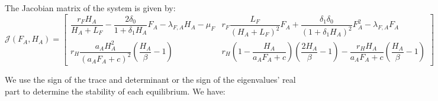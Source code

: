 \documentclass{article}
\newcommand{\lfa}{\lambda_{F, A}}
\begin{document}
The Jacobian matrix of the system is given by:
\begin{equation}
\mathcal{J}(F_A,H_A) =  \begin{bmatrix}
\dfrac{r_F H_A}{H_A+L_F}- \dfrac{2\delta_0}{1 + \delta_1 H_A}F_A - \lfa H_A - \mu_F & r_F \dfrac{L_F}{(H_A+L_F)^2}F_A + \dfrac{\delta_1 \delta_0}{(1+\delta_1 H_A)^2} F_A^2  - \lfa F_A\\
r_H \dfrac{a_AH_A^2}{(a_AF_A+c)^2} (\dfrac{H_A}{\beta}-1) & r_H(1-\dfrac{H_A}{a_AF_A+c})(\dfrac{2H_A}{\beta}-1) - \dfrac{r_H H_A}{a_AF_A+c}(\dfrac{H_A}{\beta}-1)
\end{bmatrix}
\end{equation}

We use the sign of the trace and determinant or the sign of the eigenvalues' real part to determine the stability of each equilibrium. We have:
\end{document}
